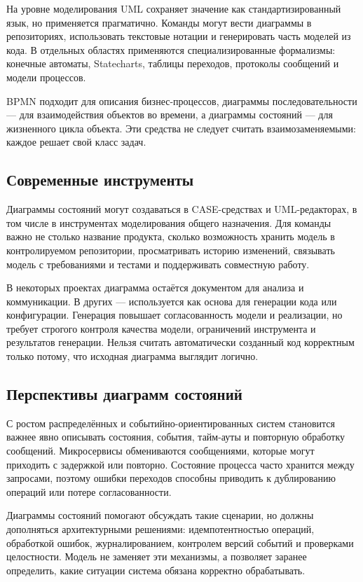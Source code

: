 \documentclass[essay,paper]{pmk-graduate}
\begin{document}
На уровне моделирования UML сохраняет значение как стандартизированный язык, но применяется прагматично. Команды могут вести диаграммы в репозиториях, использовать текстовые нотации и генерировать часть моделей из кода. В отдельных областях применяются специализированные формализмы: конечные автоматы, Statecharts, таблицы переходов, протоколы сообщений и модели процессов.

BPMN подходит для описания бизнес-процессов, диаграммы последовательности — для взаимодействия объектов во времени, а диаграммы состояний — для жизненного цикла объекта. Эти средства не следует считать взаимозаменяемыми: каждое решает свой класс задач.

\subsection{Современные инструменты}

Диаграммы состояний могут создаваться в CASE-средствах и UML-редакторах, в том числе в инструментах моделирования общего назначения. Для команды важно не столько название продукта, сколько возможность хранить модель в контролируемом репозитории, просматривать историю изменений, связывать модель с требованиями и тестами и поддерживать совместную работу.

В некоторых проектах диаграмма остаётся документом для анализа и коммуникации. В других — используется как основа для генерации кода или конфигурации. Генерация повышает согласованность модели и реализации, но требует строгого контроля качества модели, ограничений инструмента и результатов генерации. Нельзя считать автоматически созданный код корректным только потому, что исходная диаграмма выглядит логично.

\subsection{Перспективы диаграмм состояний}

С ростом распределённых и событийно-ориентированных систем становится важнее явно описывать состояния, события, тайм-ауты и повторную обработку сообщений. Микросервисы обмениваются сообщениями, которые могут приходить с задержкой или повторно. Состояние процесса часто хранится между запросами, поэтому ошибки переходов способны приводить к дублированию операций или потере согласованности.

Диаграммы состояний помогают обсуждать такие сценарии, но должны дополняться архитектурными решениями: идемпотентностью операций, обработкой ошибок, журналированием, контролем версий событий и проверками целостности. Модель не заменяет эти механизмы, а позволяет заранее определить, какие ситуации система обязана корректно обрабатывать.
\end{document}
